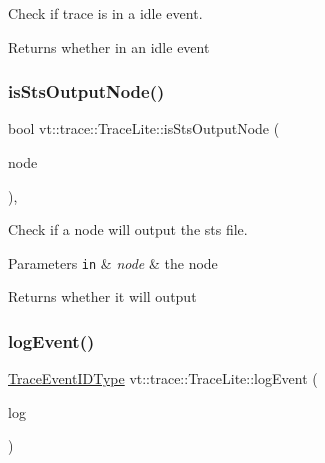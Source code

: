 Check if trace is in a idle event. 

\begin{DoxyReturn}{Returns}
whether in an idle event 
\end{DoxyReturn}
\mbox{\label{structvt_1_1trace_1_1_trace_lite_acfad34ebd68c53547dcff4115dd54388}} 
\subsubsection{\texorpdfstring{is\+Sts\+Output\+Node()}{isStsOutputNode()}}
{\footnotesize\ttfamily bool vt\+::trace\+::\+Trace\+Lite\+::is\+Sts\+Output\+Node (\begin{DoxyParamCaption}\item[{\hyperlink{namespacevt_a866da9d0efc19c0a1ce79e9e492f47e2}{Node\+Type}}]{node }\end{DoxyParamCaption})\hspace{0.3cm}{\ttfamily [static]}, {\ttfamily [protected]}}



Check if a node will output the sts file. 


\begin{DoxyParams}[1]{Parameters}
\mbox{\tt in}  & {\em node} & the node\\
\hline
\end{DoxyParams}
\begin{DoxyReturn}{Returns}
whether it will output 
\end{DoxyReturn}
\mbox{\label{structvt_1_1trace_1_1_trace_lite_aeb468f1222761674e4ffb0cfa27f0641}} 
\subsubsection{\texorpdfstring{log\+Event()}{logEvent()}}
{\footnotesize\ttfamily \hyperlink{namespacevt_1_1trace_a64a7185f3e102df8d8258f263ccd1582}{Trace\+Event\+I\+D\+Type} vt\+::trace\+::\+Trace\+Lite\+::log\+Event (\begin{DoxyParamCaption}\item[{\hyperlink{structvt_1_1trace_1_1_trace_lite_aeb73e523d31829d3163c877b145afa2a}{Log\+Type} \&\&}]{log }\end{DoxyParamCaption})\hspace{0.3cm}{\ttfamily [protected]}}



